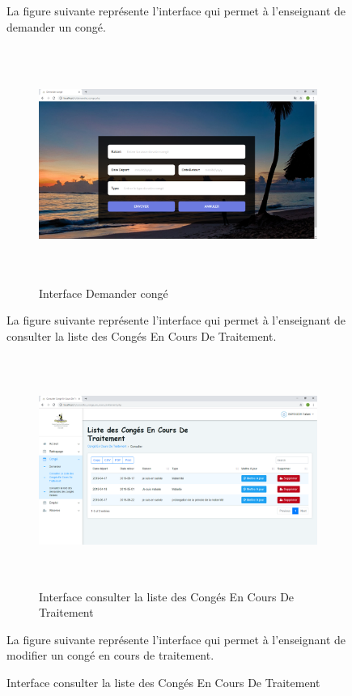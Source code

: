 \documentclass[12 pt]{report}
\begin{document}
\begin{figure}[h]
\begin{center}
\begin{figure}[h]
\begin{center}
\end{center}
\end{figure}
La figure suivante représente l'interface qui permet à l'enseignant de  demander un congé.

\begin{figure}[h]
 \begin{center}
\includegraphics[width= 15 cm ,height=  7.7cm]{demander_conge.PNG}
\caption{Interface Demander congé}

\end{center}
\end{figure}
\newpage
La figure suivante représente l'interface qui permet à l'enseignant de consulter la liste des Congés En Cours De Traitement.

\begin{figure}[h]
 \begin{center}
\includegraphics[width= 18 cm ,height=  7.5cm]{consulter_conge_t.PNG}
\caption{Interface consulter la liste des Congés En Cours De Traitement}

\end{center}
\end{figure}
La figure suivante représente l'interface qui permet à l'enseignant de modifier un congé en cours de traitement.


\end{center}
\end{figure}
\end{document}
